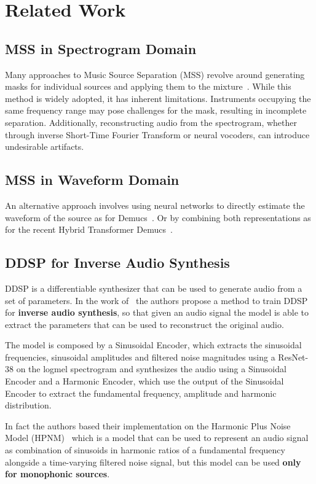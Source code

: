 \documentclass{article}
\begin{document}
\section{Related Work}
\subsection{MSS in Spectrogram Domain}
Many approaches to Music Source Separation (MSS) revolve around generating masks for individual sources and applying them to the mixture~\cite{opensourceseparation:book}.
While this method is widely adopted, it has inherent limitations. Instruments occupying the same frequency range may pose challenges for the mask, resulting in incomplete separation.
Additionally, reconstructing audio from the spectrogram, whether through inverse Short-Time Fourier Transform or neural vocoders, can introduce undesirable artifacts.

\subsection{MSS in Waveform Domain}
An alternative approach involves using neural networks to directly estimate the waveform of the source as for Demucs~\cite{défossez2019demucs}.
Or by combining both representations as for the recent Hybrid Transformer Demucs~\cite{rouard2022hybrid}.

\subsection{DDSP for Inverse Audio Synthesis}
DDSP is a differentiable synthesizer that can be used to generate audio from a set of parameters.
In the work of~\cite{ddsp_icml} the authors propose a method to train DDSP for \textbf{inverse audio synthesis}, so that
given an audio signal the model is able to extract the parameters that can be used to reconstruct the original audio.

The model is composed by a Sinusoidal Encoder, which extracts the sinusoidal frequencies, sinusoidal amplitudes and filtered noise magnitudes
using a ResNet-38 on the logmel spectrogram and synthesizes the audio using a Sinusoidal Encoder and a Harmonic Encoder, which use the 
output of the Sinusoidal Encoder to extract the fundamental frequency, amplitude and harmonic distribution.

In fact the authors based their implementation on the Harmonic Plus Noise Model (HPNM)~\cite{Serra1990} which is a model that
can be used to represent an audio signal as combination of sinusoids in harmonic ratios of a fundamental frequency
alongside a time-varying filtered noise signal, but this model can be used \textbf{only for monophonic sources}.
\end{document}

